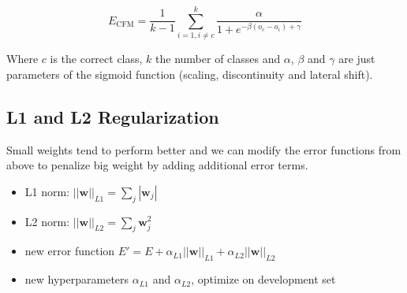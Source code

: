 \begin{equation}\label{eq:cfm}
E_{\text{CFM}} = \frac{1}{k-1} \sum_{i=1,i\neq c}^k \frac{\alpha}{1+e^{-\beta (o_c - o_i) + \gamma}}
\end{equation}

Where $c$ is the correct class, $k$ the number of classes and $\alpha$, $\beta$ and $\gamma$ are just parameters of the sigmoid function (scaling, discontinuity and lateral shift).

\subsection{L1 and L2 Regularization}
Small weights tend to perform better and we can modify the error functions from above to penalize big weight by adding additional error terms.
\begin{itemize}
\item L1 norm: $||\mathbf{w}||_{L1} = \sum_j |\mathbf{w}_j|$
\item L2 norm: $||\mathbf{w}||_{L2} = \sum_j \mathbf{w}_j^2$
\item new error function $E' = E + \alpha_{L1} ||\mathbf{w}||_{L1} + \alpha_{L2} ||\mathbf{w}||_{L2}$
\item new hyperparameters $\alpha_{L1}$ and $\alpha_{L2}$, optimize on development set
\end{itemize}

